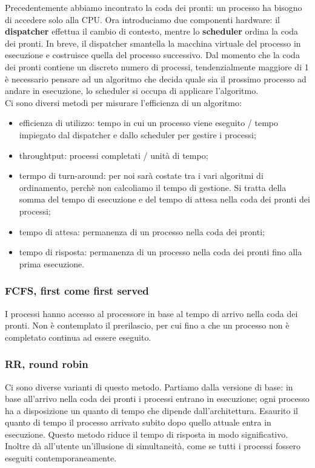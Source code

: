\documentclass{article}
\begin{document}
Precedentemente abbiamo incontrato la coda dei pronti: un processo ha bisogno di accedere solo alla CPU. Ora introduciamo due componenti hardware: il \textbf{dispatcher} effettua il cambio di contesto, mentre lo \textbf{scheduler} ordina la coda dei pronti. In breve, il dispatcher smantella la macchina virtuale del processo in esecuzione e costruisce quella del processo successivo. Dal momento che la coda dei pronti contiene un discreto numero di processi, tendenzialmente maggiore di 1 è necessario pensare ad un algoritmo che decida quale sia il prossimo processo ad andare in esecuzione, lo scheduler si occupa di applicare l'algoritmo.\\

Ci sono diversi metodi per misurare l'efficienza di un algoritmo:
\begin{itemize} 
	\item efficienza di utilizzo: tempo in cui un processo viene eseguito / tempo impiegato dal dispatcher e dallo scheduler per gestire i processi;

	\item throughtput: processi completati / unità di tempo;

	\item termpo di turn-around: per noi sarà costate tra i vari algoritmi di ordinamento, perchè non calcoliamo il tempo di gestione. Si tratta della somma del tempo di esecuzione e del tempo di attesa nella coda dei pronti dei processi;

	\item tempo di attesa: permanenza di un processo nella coda dei pronti;

	\item tempo di risposta: permanenza di un processo nella coda dei pronti fino alla prima esecuzione.
\end{itemize}

\subsubsection{FCFS, first come first served}
I processi hanno accesso al processore in base al tempo di arrivo nella coda dei pronti. Non è contemplato il prerilascio, per cui fino a che un processo non è completato continua ad essere eseguito.

\subsubsection{RR, round robin}
Ci sono diverse varianti di questo metodo. Partiamo dalla versione di base: in base all'arrivo nella coda dei pronti i processi entrano in esecuzione; ogni processo ha a disposizione un quanto di tempo che dipende dall'architettura. Esaurito il quanto di tempo il processo arrivato subito dopo quello attuale entra in esecuzione. Questo metodo riduce il tempo di risposta in modo significativo. Inoltre dà all'utente un'illusione di simultaneità, come se tutti i processi fossero eseguiti contemporaneamente. \\
\end{document}
